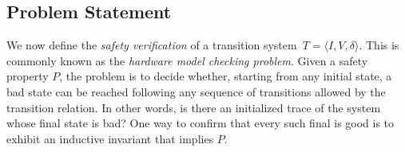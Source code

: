\subsection{Problem Statement} 

We now define the \textit{safety verification} of a transition system~$T = \langle I,V,\delta\rangle$.
This is commonly known as the \textit{hardware model checking problem}.  
Given a safety property $P$, the problem is to decide whether, starting from any initial state, a bad state can be reached following any sequence of transitions allowed by the transition relation. In other words, is there an initialized trace of the system whose final state is bad? One way to confirm that every such final is good is to exhibit an inductive invariant that implies $P$.

